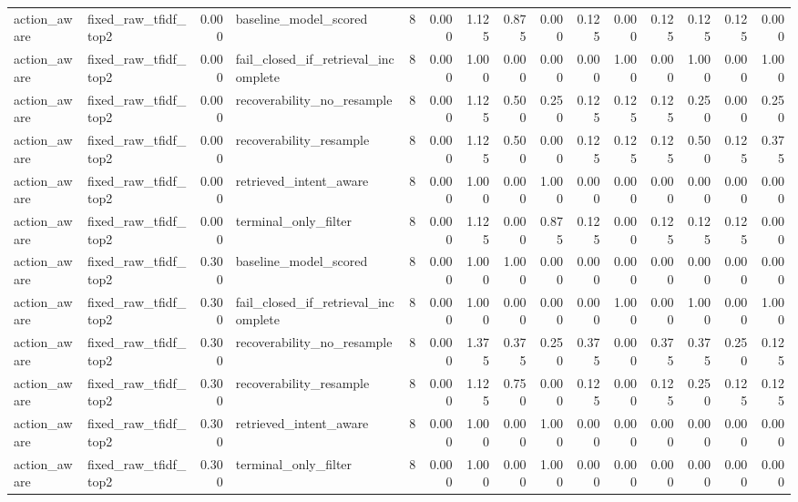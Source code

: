 \begin{tabular}{llrlrrrrrrrrrrr}
action_aware & fixed_raw_tfidf_top2 & 0.000 & baseline_model_scored & 8 & 0.000 & 1.125 & 0.875 & 0.000 & 0.125 & 0.000 & 0.125 & 0.125 & 0.125 & 0.000 \\
action_aware & fixed_raw_tfidf_top2 & 0.000 & fail_closed_if_retrieval_incomplete & 8 & 0.000 & 1.000 & 0.000 & 0.000 & 0.000 & 1.000 & 0.000 & 1.000 & 0.000 & 1.000 \\
action_aware & fixed_raw_tfidf_top2 & 0.000 & recoverability_no_resample & 8 & 0.000 & 1.125 & 0.500 & 0.250 & 0.125 & 0.125 & 0.125 & 0.250 & 0.000 & 0.250 \\
action_aware & fixed_raw_tfidf_top2 & 0.000 & recoverability_resample & 8 & 0.000 & 1.125 & 0.500 & 0.000 & 0.125 & 0.125 & 0.125 & 0.500 & 0.125 & 0.375 \\
action_aware & fixed_raw_tfidf_top2 & 0.000 & retrieved_intent_aware & 8 & 0.000 & 1.000 & 0.000 & 1.000 & 0.000 & 0.000 & 0.000 & 0.000 & 0.000 & 0.000 \\
action_aware & fixed_raw_tfidf_top2 & 0.000 & terminal_only_filter & 8 & 0.000 & 1.125 & 0.000 & 0.875 & 0.125 & 0.000 & 0.125 & 0.125 & 0.125 & 0.000 \\
action_aware & fixed_raw_tfidf_top2 & 0.300 & baseline_model_scored & 8 & 0.000 & 1.000 & 1.000 & 0.000 & 0.000 & 0.000 & 0.000 & 0.000 & 0.000 & 0.000 \\
action_aware & fixed_raw_tfidf_top2 & 0.300 & fail_closed_if_retrieval_incomplete & 8 & 0.000 & 1.000 & 0.000 & 0.000 & 0.000 & 1.000 & 0.000 & 1.000 & 0.000 & 1.000 \\
action_aware & fixed_raw_tfidf_top2 & 0.300 & recoverability_no_resample & 8 & 0.000 & 1.375 & 0.375 & 0.250 & 0.375 & 0.000 & 0.375 & 0.375 & 0.250 & 0.125 \\
action_aware & fixed_raw_tfidf_top2 & 0.300 & recoverability_resample & 8 & 0.000 & 1.125 & 0.750 & 0.000 & 0.125 & 0.000 & 0.125 & 0.250 & 0.125 & 0.125 \\
action_aware & fixed_raw_tfidf_top2 & 0.300 & retrieved_intent_aware & 8 & 0.000 & 1.000 & 0.000 & 1.000 & 0.000 & 0.000 & 0.000 & 0.000 & 0.000 & 0.000 \\
action_aware & fixed_raw_tfidf_top2 & 0.300 & terminal_only_filter & 8 & 0.000 & 1.000 & 0.000 & 1.000 & 0.000 & 0.000 & 0.000 & 0.000 & 0.000 & 0.000 \\
\bottomrule
\end{tabular}


